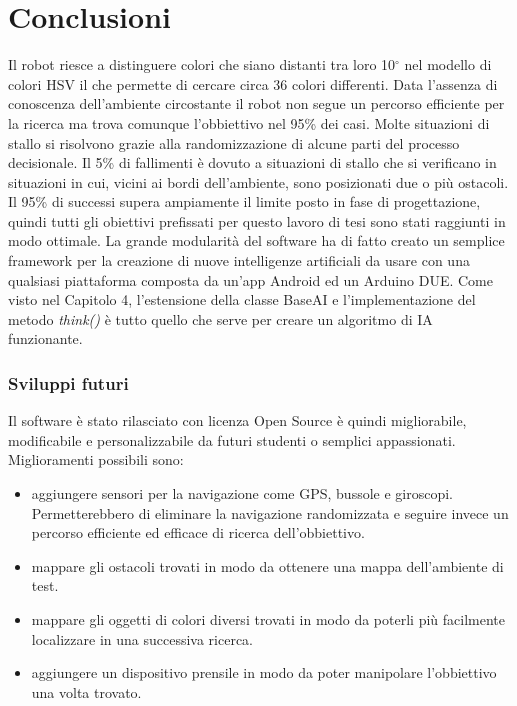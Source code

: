 \chapter*{Conclusioni}
\fancyfoot[C]{\thepage}
Il robot riesce 
a distinguere colori che siano distanti tra loro 10$^\circ$ nel modello di colori HSV
il che permette di cercare circa 36 colori differenti. Data l'assenza di conoscenza 
dell'ambiente circostante il robot non segue un percorso efficiente per la ricerca ma trova comunque l'obbiettivo
nel 95\% dei casi. Molte situazioni di stallo si risolvono grazie alla randomizzazione 
di alcune parti del processo decisionale. Il 5\% di fallimenti è dovuto a situazioni di stallo 
che si verificano in situazioni in cui, vicini ai bordi dell'ambiente, sono posizionati 
due o più ostacoli. Il 95\% di successi supera ampiamente il limite posto in fase di progettazione, 
quindi tutti gli obiettivi prefissati per questo lavoro di tesi sono stati raggiunti in modo
ottimale.
La grande modularità del software ha di fatto creato un semplice framework per 
la creazione di nuove intelligenze artificiali da usare con una qualsiasi piattaforma
composta da un'app Android ed un Arduino DUE. Come visto nel Capitolo 4, l'estensione della
classe BaseAI e l'implementazione del metodo \emph{think()} è tutto quello che serve per
creare un algoritmo di IA funzionante.
\subsection* {Sviluppi futuri}
Il software è stato rilasciato con licenza Open Source è quindi migliorabile, 
modificabile e personalizzabile da futuri studenti o semplici appassionati.
Miglioramenti possibili sono:
\begin{itemize}
\item aggiungere sensori per la navigazione come GPS, 
bussole e giroscopi. Permetterebbero di eliminare la navigazione randomizzata e seguire invece un percorso efficiente ed efficace
di ricerca dell'obbiettivo.
\item mappare gli ostacoli trovati in modo da ottenere una mappa dell'ambiente di test.
\item mappare gli oggetti di colori diversi trovati in modo da poterli più facilmente localizzare 
in una successiva ricerca.
\item aggiungere un dispositivo prensile in modo da poter manipolare l'obbiettivo una volta trovato.
\end{itemize}

